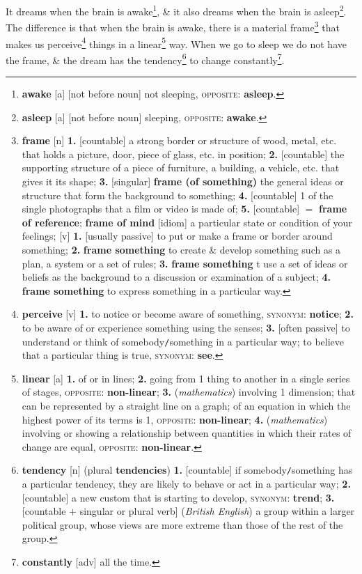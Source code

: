 \documentclass[oneside]{book}
\numberwithin{equation}{section}
\begin{document}
 It dreams when the brain is awake\footnote{\textbf{awake} [a] [not before noun] not sleeping, \textsc{opposite}: \textbf{asleep}.}, \& it also dreams when the brain is asleep\footnote{\textbf{asleep} [a] [not before noun] sleeping, \textsc{opposite}: \textbf{awake}.}. The difference is that when the brain is awake, there is a material frame\footnote{\textbf{frame} [n] \textbf{1.} [countable] a strong border or structure of wood, metal, etc. that holds a picture, door, piece of glass, etc. in position; \textbf{2.} [countable] the supporting structure of a piece of furniture, a building, a vehicle, etc. that gives it its shape; \textbf{3.} [singular] \textbf{frame (of something)} the general ideas or structure that form the background to something; \textbf{4.} [countable] 1 of the single photographs that a film or video is made of; \textbf{5.} [countable] $=$ \textbf{frame of reference}; \textbf{frame of mind} [idiom] a particular state or condition of your feelings; [v] \textbf{1.} [usually passive] to put or make a frame or border around something; \textbf{2.} \textbf{frame something} to create \& develop something such as a plan, a system or a set of rules; \textbf{3.} \textbf{frame something} t use a set of ideas or beliefs as the background to a discussion or examination of a subject; \textbf{4.} \textbf{frame something} to express something in a particular way.} that makes us perceive\footnote{\textbf{perceive} [v] \textbf{1.} to notice or become aware of something, \textsc{synonym}: \textbf{notice}; \textbf{2.} to be aware of or experience something using the senses; \textbf{3.} [often passive] to understand or think of somebody\texttt{/}something in a particular way; to believe that a particular thing is true, \textsc{synonym}: \textbf{see}.} things in a linear\footnote{\textbf{linear} [a] \textbf{1.} of or in lines; \textbf{2.} going from 1 thing to another in a single series of stages, \textsc{opposite}: \textbf{non-linear}; \textbf{3.} (\textit{mathematics}) involving 1 dimension; that can be represented by a straight line on a graph; of an equation in which the highest power of its terms is 1, \textsc{opposite}: \textbf{non-linear}; \textbf{4.} (\textit{mathematics}) involving or showing a relationship between quantities in which their rates of change are equal, \textsc{opposite}: \textbf{non-linear}.} way. When we go to sleep we do not have the frame, \& the dream has the tendency\footnote{\textbf{tendency} [n] (plural \textbf{tendencies}) \textbf{1.} [countable] if somebody\texttt{/}something has a particular tendency, they are likely to behave or act in a particular way; \textbf{2.} [countable] a new custom that is starting to develop, \textsc{synonym}: \textbf{trend}; \textbf{3.} [countable $+$ singular or plural verb] (\textit{British English}) a group within a larger political group, whose views are more extreme than those of the rest of the group.} to change constantly\footnote{\textbf{constantly} [adv] all the time.}.
\end{document}
